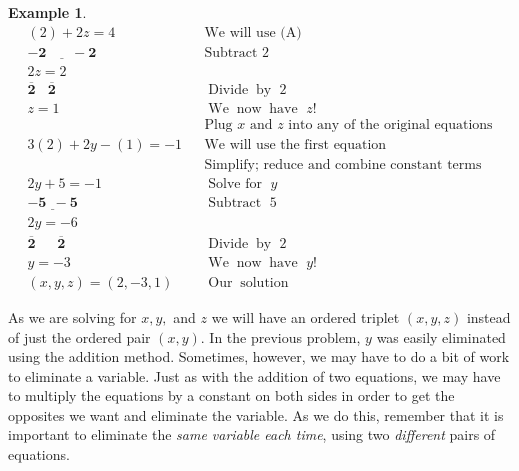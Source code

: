 \documentclass[12pt]{book}
\theoremstyle{definition}
\newtheorem{example}{Example}
\newcommand{\tmmathbf}[1]{\ensuremath{\boldsymbol{#1}}}
\newcommand{\tmop}[1]{\ensuremath{\operatorname{#1}}}
\begin{document}
\begin{example}
 \begin{eqnarray*}
    (2) + 2 z = 4~~ &  & \text{We~will~use~(A)}\\
    \tmmathbf{\underline{- 2 ~~~~~~~~- 2}} &  & \text{Subtract~} 2\\
    2 z = 2~~ &  &\\
    \tmmathbf{\overline{2} ~~~~ \overline{2}}~~ &  &  \tmop{Divide} \tmop{by~} 2\\
    z = 1~~ &  & \tmop{We} \tmop{now} \tmop{have~} z!\\
    &  &  \text{Plug~} x \text{~and~} z \text{~into~any~of~the~} \text{original~equations}\\
    3 (2) + 2 y - (1) = - 1 &  & \tmop{We~will~use~the~first~equation}\\
    &  & \tmop{Simplify;~reduce~and~combine~constant~terms}\\
		2 y + 5 = - 1 & & \tmop{Solve~for~} y\\
		\tmmathbf{\underline{- 5 ~~- 5}} &  &\tmop{Subtract~} 5\\
    2 y = - 6 &  &\\
    \tmmathbf{\overline{2} ~~~~~~~ \overline{2}} &  &  \tmop{Divide} \tmop{by~} 2\\
    y = - 3 &  & \tmop{We} \tmop{now} \tmop{have~} y!\\
    (x,y,z)=(2, - 3, 1) &  & \tmop{Our} \tmop{solution}
  \end{eqnarray*}
\end{example}
As we are solving for $x, y,$ and $z$ we will have an ordered triplet $(x, y, z)$ instead of just the ordered pair $(x, y)$. In the previous problem, $y$ was easily eliminated using the addition method. Sometimes, however, we may have to do a bit of work to eliminate a variable. Just as with the addition of two equations, we may have to multiply the equations by a constant on both sides in order to get the opposites we want and eliminate the variable. As we do this, remember that it is important to eliminate the {\it same variable each time}, using two {\it different} pairs of equations.
\end{document}
